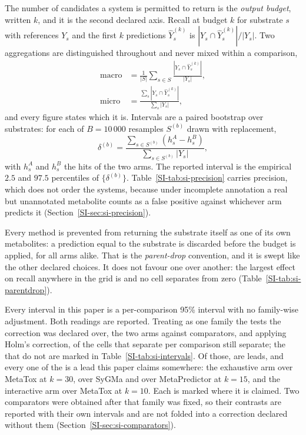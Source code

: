 The number of candidates a system is permitted to return is the \emph{output budget}, written
$k$, and it is the second declared axis. Recall at budget $k$ for substrate $s$ with references
$Y_s$ and the first $k$ predictions $\hat{Y}^{(k)}_s$ is $|Y_s \cap \hat{Y}^{(k)}_s| / |Y_s|$. Two aggregations are distinguished
throughout and never mixed within a comparison,
\begin{align}
\mathrm{macro} &= \frac{1}{|S|}\sum_{s \in S}
\frac{|Y_s \cap \hat{Y}^{(k)}_s|}{|Y_s|}, \\
\mathrm{micro} &= \frac{\sum_{s} |Y_s \cap \hat{Y}^{(k)}_s|}{\sum_{s} |Y_s|},
\end{align}
and every figure states which it is. Intervals are a paired bootstrap over substrates: for each of
$B = 10\,000$ resamples $S^{(b)}$ drawn with replacement,
\begin{equation}
\delta^{(b)} = \frac{\sum_{s \in S^{(b)}} \left( h^A_s - h^B_s \right)}
{\sum_{s \in S^{(b)}} |Y_s|},
\label{eq:bootstrap}
\end{equation}
with $h^A_s$ and $h^B_s$ the hits of the two arms. The reported interval is the empirical $2.5$ and
$97.5$ percentiles of $\{\delta^{(b)}\}$. Table~\ref{SI-tab:si-precision} carries precision, which does not order the systems, because under incomplete annotation a real but unannotated metabolite counts as a false positive against whichever arm predicts it (Section~\ref{SI-sec:si-precision}).

Every method is prevented from returning the substrate itself as one of its own metabolites:
a prediction equal to the substrate is discarded before the budget is applied, for all arms
alike. That is the \emph{parent-drop} convention, and it is swept like the other declared
choices.
It does not favour one over another: the largest effect on recall anywhere in the grid is
\numPdropMaxEffect{} and no cell separates from zero (Table~\ref{SI-tab:si-parentdrop}).

Every interval in this paper is a per-comparison 95\% interval with no family-wise adjustment.
Both readings are reported. Treating as one family the \numHolmTests{} tests the correction was declared over, the two arms against \numSweepFamilycomparatorsWord{} comparators, and applying Holm's correction, \numHolmSurviving{} of the \numHolmSeparating{} cells that separate per comparison still separate; the \numHolmChangedWord{} that do not are marked in Table~\ref{SI-tab:si-intervals}. Of those, \numHolmLeadsremovedWord{} are leads, and every one of the
\numHolmLeadsremovedWord{} is a lead this paper claims somewhere: the exhaustive arm over
MetaTox at $k=30$, over SyGMa and over MetaPredictor at $k=15$, and the interactive arm over
MetaTox at $k=10$. Each is marked where it is claimed. Two
comparators were obtained after that family was fixed, so their contrasts are reported with their
own intervals and are not folded into a correction declared without them
(Section~\ref{SI-sec:si-comparators}).

